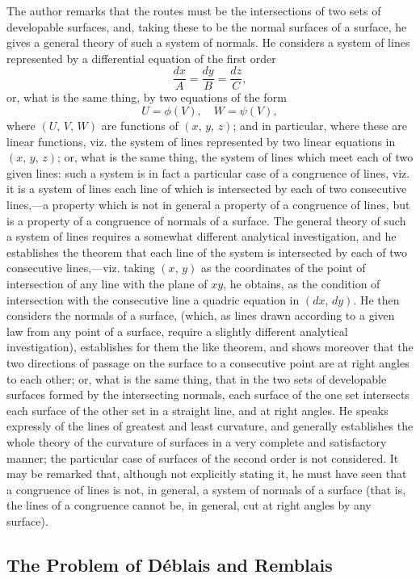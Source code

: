\documentclass[11pt,a4paper]{article}
\theoremstyle{cayley}
\begin{document}
The author remarks that the routes must be the intersections of two sets of developable surfaces, and, taking these to be the normal surfaces of a surface, he gives a general theory of such a system of normals. He considers a system of lines represented by a differential equation of the first order
\[
\frac{dx}{A} = \frac{dy}{B} = \frac{dz}{C},
\]
or, what is the same thing, by two equations of the form
\[
U = \phi(V),\quad W = \psi(V),
\]
where $(U,\, V,\, W)$ are functions of $(x,\, y,\, z)$; and in particular, where these are linear functions, viz. the system of lines represented by two linear equations in $(x,\, y,\, z)$; or, what is the same thing, the system of lines which meet each of two given lines: such a system is in fact a particular case of a congruence of lines, viz. it is a system of lines each line of which is intersected by each of two consecutive lines,---a property which is not in general a property of a congruence of lines, but is a property of a congruence of normals of a surface. The general theory of such a system of lines requires a somewhat different analytical investigation, and he establishes the theorem that each line of the system is intersected by each of two consecutive lines,---viz. taking $(x,\, y)$ as the coordinates of the point of intersection of any line with the plane of $xy$, he obtains, as the condition of intersection with the consecutive line a quadric equation in $(dx,\, dy)$. He then considers the normals of a surface, (which, as lines drawn according to a given law from any point of a surface, require a slightly different analytical investigation), establishes for them the like theorem, and shows moreover that the two directions of passage on the surface to a consecutive point are at right angles to each other; or, what is the same thing, that in the two sets of developable surfaces formed by the intersecting normals, each surface of the one set intersects each surface of the other set in a straight line, and at right angles. He speaks expressly of the lines of greatest and least curvature, and generally establishes the whole theory of the curvature of surfaces in a very complete and satisfactory manner; the particular case of surfaces of the second order is not considered. It may be remarked that, although not explicitly stating it, he must have seen that a congruence of lines is not, in general, a system of normals of a surface (that is, the lines of a congruence cannot be, in general, cut at right angles by any surface).

\subsection*{The Problem of D\'{e}blais and Remblais}
\end{document}
